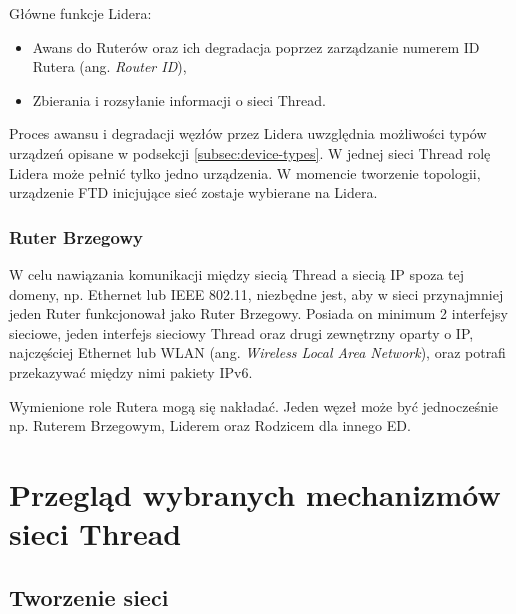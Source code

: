        Główne funkcje Lidera:
        \begin{itemize}
            \item Awans do Ruterów oraz ich degradacja poprzez zarządzanie numerem ID Rutera (ang. \textit{Router ID}),
            \item Zbierania i rozsyłanie informacji o sieci Thread.
        \end{itemize}

        Proces awansu i degradacji węzłów przez Lidera uwzględnia możliwości typów urządzeń opisane w podsekcji \ref{subsec:device-types}. W jednej sieci Thread rolę Lidera może pełnić tylko jedno urządzenia. W momencie tworzenie topologii, urządzenie FTD inicjujące sieć zostaje wybierane na Lidera.
        
        \subsubsection{Ruter Brzegowy}

        W celu nawiązania komunikacji między siecią Thread a siecią IP spoza tej domeny, np. Ethernet lub IEEE 802.11, niezbędne jest, aby w sieci przynajmniej jeden Ruter funkcjonował jako Ruter Brzegowy. Posiada on minimum 2 interfejsy sieciowe, jeden interfejs sieciowy Thread oraz drugi zewnętrzny oparty o IP, najczęściej Ethernet lub WLAN (ang. \textit{Wireless Local Area Network}), oraz potrafi przekazywać między nimi pakiety IPv6.

    Wymienione role Rutera mogą się nakładać. Jeden węzeł może być jednocześnie np. Ruterem Brzegowym, Liderem oraz Rodzicem dla innego ED.

\section{Przegląd wybranych mechanizmów sieci Thread}

    \subsection{Tworzenie sieci}
    \label{subsec:network-forming}

